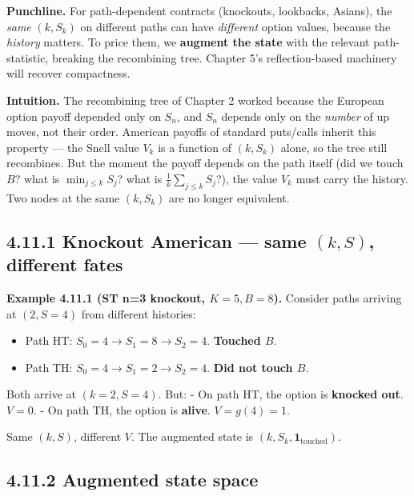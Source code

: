 \documentclass[
  10pt,
  twoside]{book}
\providecommand{\tightlist}{%
  \setlength{\itemsep}{0pt}\setlength{\parskip}{0pt}}
\begin{document}
\textbf{Punchline.} For path-dependent contracts (knockouts, lookbacks,
Asians), the \emph{same} \((k, S_k)\) on different paths can have
\emph{different} option values, because the \emph{history} matters. To
price them, we \textbf{augment the state} with the relevant
path-statistic, breaking the recombining tree. Chapter 5's
reflection-based machinery will recover compactness.

\textbf{Intuition.} The recombining tree of Chapter 2 worked because the
European option payoff depended only on \(S_n\), and \(S_n\) depends
only on the \emph{number} of up moves, not their order. American payoffs
of standard puts/calls inherit this property --- the Snell value \(V_k\)
is a function of \((k, S_k)\) alone, so the tree still recombines. But
the moment the payoff depends on the path itself (did we touch \(B\)?
what is \(\min_{j \le k} S_j\)? what is
\(\frac{1}{k}\sum_{j \le k} S_j\)?), the value \(V_k\) must carry the
history. Two nodes at the same \((k, S_k)\) are no longer equivalent.

\subsection{\texorpdfstring{4.11.1 Knockout American --- same
\((k, S)\), different
fates}{4.11.1 Knockout American --- same (k, S), different fates}}\label{knockout-american-same-k-s-different-fates}

\textbf{Example 4.11.1 (ST n=3 knockout, \(K = 5, B = 8\)).} Consider
paths arriving at \((2, S = 4)\) from different histories:

\begin{itemize}
\tightlist
\item
  Path HT: \(S_0 = 4 \to S_1 = 8 \to S_2 = 4\). \textbf{Touched \(B\)}.
\item
  Path TH: \(S_0 = 4 \to S_1 = 2 \to S_2 = 4\). \textbf{Did not touch
  \(B\)}.
\end{itemize}

Both arrive at \((k=2, S=4)\). But: - On path HT, the option is
\textbf{knocked out}. \(V = 0\). - On path TH, the option is
\textbf{alive}. \(V = g(4) = 1\).

Same \((k, S)\), different \(V\). The augmented state is
\((k, S_k, \mathbf{1}_{\text{touched}})\).

\subsection{4.11.2 Augmented state space}\label{augmented-state-space}
\end{document}

